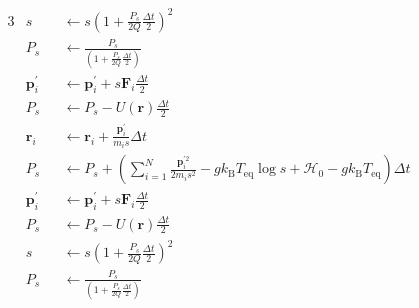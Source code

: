 \begin{alignat}{3}
  &s &&\gets
  s \left(1 + \frac{P_{s}}{2Q} \frac{\Delta t}{2}\right)^{2}
  \\
  &P_{s} &&\gets
  \frac{P_{s}}{\left(1 + \frac{P_{s}}{2Q} \frac{\Delta t}{2}\right)}
  \\
  &\bm{p}_{i}^{\prime} &&\gets
  \bm{p}_{i}^{\prime} + s \bm{F}_{i} \frac{\Delta t}{2}
  \\
  &P_{s} &&\gets
  P_{s} - U(\bm{r}) \frac{\Delta t}{2}
  \\
  &\bm{r}_{i} &&\gets
  \bm{r}_{i} + \frac{\bm{p}_{i}^{\prime}}{m_{i}s} \Delta t
  \\
  &P_{s} &&\gets
  P_{s} +
  \left(
    \sum_{i=1}^{N}
    \frac{\bm{p}_{i}^{\prime 2}}{2m_{i}s^{2}}
    -
    g k_{\mathrm{B}} T_{\mathrm{eq}} \log s
    +
    \mathcal{H}_{0}
    -
    g k_{\mathrm{B}} T_{\mathrm{eq}}
  \right)
  \Delta t
  \\
  &\bm{p}_{i}^{\prime} &&\gets
  \bm{p}_{i}^{\prime} + s \bm{F}_{i} \frac{\Delta t}{2}
  \\
  &P_{s} &&\gets
  P_{s} - U(\bm{r}) \frac{\Delta t}{2}
  \\
  &s &&\gets
  s \left(1 + \frac{P_{s}}{2Q} \frac{\Delta t}{2}\right)^{2}
  \\
  &P_{s} &&\gets
  \frac{P_{s}}{\left(1 + \frac{P_{s}}{2Q} \frac{\Delta t}{2}\right)}
\end{alignat}

